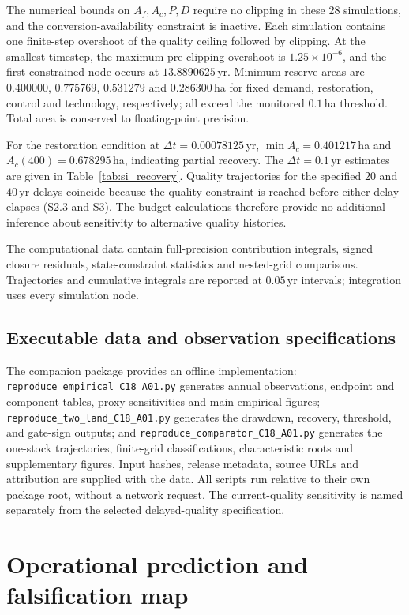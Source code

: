 \documentclass[11pt,a4paper]{article}
\begin{document}
The numerical bounds on $A_f,A_c,P,D$ require no clipping in these 28 simulations, and the conversion-availability constraint is inactive. Each simulation contains one finite-step overshoot of the quality ceiling followed by clipping. At the smallest timestep, the maximum pre-clipping overshoot is $1.25\times10^{-6}$, and the first constrained node occurs at $13.8890625$\,yr. Minimum reserve areas are $0.400000$, $0.775769$, $0.531279$ and $0.286300$\,ha for fixed demand, restoration, control and technology, respectively; all exceed the monitored $0.1$\,ha threshold. Total area is conserved to floating-point precision.

For the restoration condition at $\Delta t=0.00078125$\,yr, $\min A_c=0.401217$\,ha and $A_c(400)=0.678295$\,ha, indicating partial recovery. The $\Delta t=0.1$\,yr estimates are given in Table~\ref{tab:si_recovery}. Quality trajectories for the specified $20$ and $40$\,yr delays coincide because the quality constraint is reached before either delay elapses (S2.3 and S3). The budget calculations therefore provide no additional inference about sensitivity to alternative quality histories.

The computational data contain full-precision contribution integrals, signed closure residuals, state-constraint statistics and nested-grid comparisons. Trajectories and cumulative integrals are reported at $0.05$\,yr intervals; integration uses every simulation node.

\subsection{Executable data and observation specifications}\label{si:execution}
The companion package provides an offline implementation: \texttt{reproduce\_empirical\_C18\_A01.py} generates annual observations, endpoint and component tables, proxy sensitivities and main empirical figures; \texttt{reproduce\_two\_land\_C18\_A01.py} generates the drawdown, recovery, threshold, and gate-sign outputs; and \texttt{reproduce\_comparator\_C18\_A01.py} generates the one-stock trajectories, finite-grid classifications, characteristic roots and supplementary figures. Input hashes, release metadata, source URLs and attribution are supplied with the data. All scripts run relative to their own package root, without a network request. The current-quality sensitivity is named separately from the selected delayed-quality specification.

\section{Operational prediction and falsification map}\label{si:predictionmap}
\end{document}
